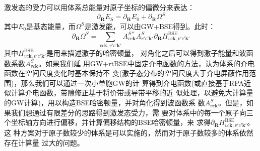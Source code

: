 {  激发态的受力可以用体系总能量对原子坐标的偏微分来表达：
  \begin{equation}
    \partial_\mathbf{R}E_S
    = 
    \partial_\mathbf{R}E_0
    +
    \partial_\mathbf{R}\Omega^S
  \end{equation}
  其中$E_0$是基态能量，而$\Omega^S$是激发能，可以由GW+BSE得到。此时：
  \begin{equation}
    \partial_\mathbf{R}\Omega^S = \sum_{vc\mathbf{k},v'c'\mathbf{k}'}
    A^{S*}_{vc\mathbf{k}}
    A^S_{v'c'\mathbf{k}'}
    \partial_\mathbf{R}
    H_{vc\mathbf{k},v'c'\mathbf{k}'}^{\mathrm{BSE}}
  \end{equation}
  其中$H_{vc\mathbf{k},v'c'\mathbf{k}'}^{\mathrm{BSE}}$是用来描述激子的哈密顿量，
  对角化之后可以得到激子能量和波函数系数$A^{S}_{vc\mathbf{k}}$。如果我们延
  用GW+rtBSE中固定介电函数的方法，认为体系的介电函数在空间尺度变化时基本保持不
  变(激子态分布的空间尺度大于介电屏蔽作用范围)，那么我们可以通过一次小单胞GW的计
  算得到介电函数(或直接基于RPA近似计算介电函数，带隙修正基于将价带或导带平移的近
  似处理，以避免大计算量的GW计算)，用以构造BSE哈密顿量，并对角化得到波函数系
  数$A^{S}_{vc\mathbf{k}}$。但是，如果我们想通过有限差分的思路得到激发态受力，需
  要对体系中的每一个原子向三个坐标轴方向进行偏移，并计算偏移结构的BSE哈密顿量，来
  求得$ \partial_\mathbf{R} H_{vc\mathbf{k},v'c'\mathbf{k}'}^{\mathrm{BSE}} $。这
  种方案对于原子数较少的体系是可以实施的，然而对于原子数较多的体系依然存在计算量
  过大的问题。

}
